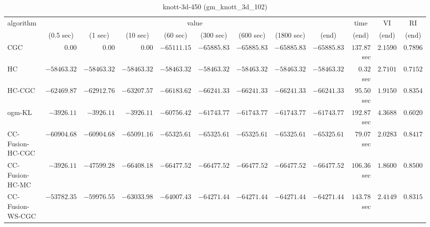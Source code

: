 \begin{table}[H]
\scriptsize
\centering
\caption{knott-3d-450 (gm\_knott\_3d\_102)}
\label{tab:anytimetable-knott-3d-450-gm-knott-3d-102}
\begin{tabular}{lrrrrrrrrrrr}
\toprule
           algorithm &                                   \multicolumn{8}{c}{value} & \multicolumn{1}{c}{time}    & \multicolumn{1}{c}{VI}  & \multicolumn{1}{c}{RI} \\  
\cmidrule(lr){2-9}\cmidrule(lr){10-10} \cmidrule(lr){11-11} \cmidrule(lr){12-12}   
                     & \multicolumn{1}{c}{(0.5 sec)} & \multicolumn{1}{c}{(1 sec)} & \multicolumn{1}{c}{(10 sec)} & \multicolumn{1}{c}{(60 sec)} & \multicolumn{1}{c}{(300 sec)} & \multicolumn{1}{c}{(600 sec)} & \multicolumn{1}{c}{(1800 sec)} & \multicolumn{1}{c}{(end)} & \multicolumn{1}{c}{(end)}    & \multicolumn{1}{c}{(end)}   & \multicolumn{1}{c}{(end)}  \\ \midrule 
                 CGC & $         0.00$ & $         0.00$ & $         0.00$ & $    -65111.15$ & $    -65885.83$ & $    -65885.83$ & $    -65885.83$ & $    -65885.83$ & $       137.87$ sec    & $       2.1590$  & $       0.7896$ \\ 
                  HC & $    -58463.32$ & $    -58463.32$ & $    -58463.32$ & $    -58463.32$ & $    -58463.32$ & $    -58463.32$ & $    -58463.32$ & $    -58463.32$ & $         0.32$ sec    & $       2.7101$  & $       0.7152$ \\ 
              HC-CGC & $    -62469.87$ & $    -62912.76$ & $    -63207.57$ & $    -66183.62$ & $    -66241.33$ & $    -66241.33$ & $    -66241.33$ & $    -66241.33$ & $        95.50$ sec    & $       1.9150$  & $       0.8354$ \\ 
              ogm-KL & $     -3926.11$ & $     -3926.11$ & $     -3926.11$ & $    -60756.42$ & $    -61743.77$ & $    -61743.77$ & $    -61743.77$ & $    -61743.77$ & $       192.87$ sec    & $       4.3688$  & $       0.6020$ \\ 
    CC-Fusion-HC-CGC & $    -60904.68$ & $    -60904.68$ & $    -65091.16$ & $    -65325.61$ & $    -65325.61$ & $    -65325.61$ & $    -65325.61$ & $    -65325.61$ & $        79.07$ sec    & $       2.0283$  & $       0.8417$ \\ 
     CC-Fusion-HC-MC & $     -3926.11$ & $    -47599.28$ & $    -66408.18$ & $    -66477.52$ & $    -66477.52$ & $    -66477.52$ & $    -66477.52$ & $    -66477.52$ & $       106.36$ sec    & $       1.8600$  & $       0.8500$ \\ 
    CC-Fusion-WS-CGC & $    -53782.35$ & $    -59976.55$ & $    -63033.98$ & $    -64007.43$ & $    -64271.44$ & $    -64271.44$ & $    -64271.44$ & $    -64271.44$ & $       143.78$ sec    & $       2.4149$  & $       0.8315$ \\ 

\end{tabular}
\end{table}
